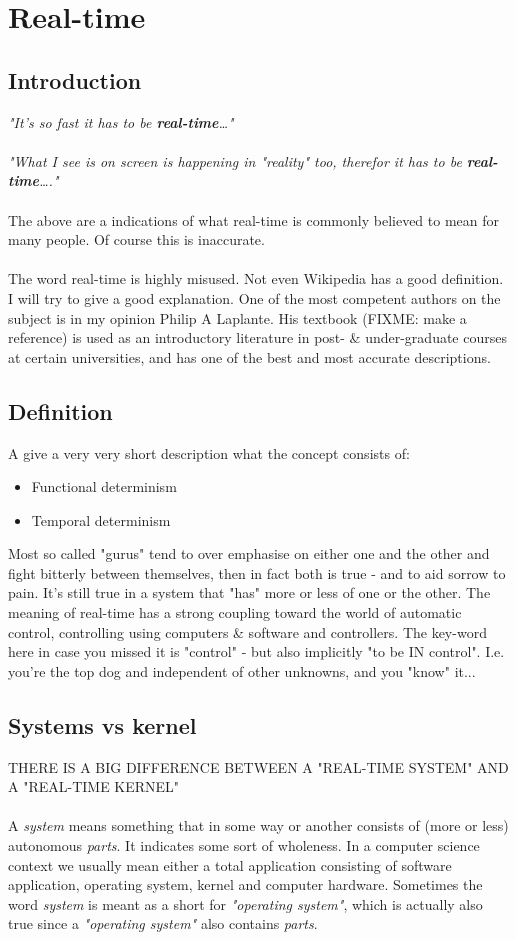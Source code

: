 \part{Real-time}
\chapter{Introduction}
\textit{"It's so fast it has to be \textbf{real-time}\ldots"}
\\\\
\textit{"What I see is on screen is happening in "reality" too, therefor it has to be \textbf{real-time}\ldots."}
\\\\
The above are a indications of what real-time is commonly believed to mean for many people. Of course this is inaccurate.
\\\\
The word real-time is highly misused. Not even Wikipedia has a good definition. I will try to give a good explanation. One of the most competent authors on the subject is in my opinion Philip A Laplante. His textbook  (FIXME: make a reference) is used as an introductory literature in post- \& under-graduate courses at certain universities, and has one of the best and most accurate descriptions.


\chapter{Definition}
A give a very very short description what the concept consists of:
\begin{itemize}
\item Functional determinism
\item Temporal determinism
\end{itemize}
Most so called "gurus" tend to over emphasise on either one and the other and fight bitterly between themselves, then in fact both is true - and to aid sorrow to pain. It's still true in a system that "has" more or less of one or the other. The meaning of real-time has a strong coupling toward the world of automatic control, controlling using computers \& software and controllers. The key-word here in case you missed it is "control" - but also implicitly "to be IN control". I.e. you're the top dog and independent of other unknowns, and you "know" it...


\chapter{Systems vs kernel}
THERE IS A BIG DIFFERENCE BETWEEN A "REAL-TIME SYSTEM" AND A "REAL-TIME KERNEL"
\\\\
A \textit{system} means something that in some way or another consists of (more or less) autonomous \textit{parts}. It indicates some sort of wholeness. In a computer science context we usually mean either a total application consisting of software application, operating system, kernel and computer hardware. Sometimes the word \textit{system} is meant as a short for \textit{"operating system"}, which is actually also true since a \textit{"operating system"} also contains \textit{parts}. 

